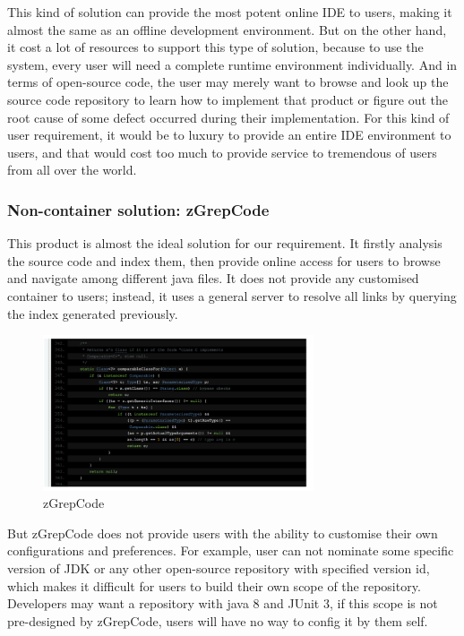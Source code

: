 \documentclass[runningheads]{llncs}
\begin{document}
This kind of solution can provide the most potent online IDE to users, making it almost the same as an offline development environment. But on the other hand, it cost a lot of resources to support this type of solution, because to use the system, every user will need a complete runtime environment individually. And in terms of open-source code, the user may merely want to browse and look up the source code repository to learn how to implement that product or figure out the root cause of some defect occurred during their implementation. For this kind of user requirement, it would be to luxury to provide an entire IDE environment to users, and that would cost too much to provide service to tremendous of users from all over the world.


\subsubsection{Non-container solution: zGrepCode\cite{zgrepcode}}
This product is almost the ideal solution for our requirement. It firstly analysis the source code and index them, then provide online access for users to browse and navigate among different java files. It does not provide any customised container to users; instead, it uses a general server to resolve all links by querying the index generated previously.

\begin{figure}[H]
	\centering
	\includegraphics[width=8cm]{pic/zGrepCode.png}
	\caption{zGrepCode}
	\label{zGrepCode}
\end{figure}

But zGrepCode does not provide users with the ability to customise their own configurations and preferences. For example, user can not nominate some specific version of JDK or any other open-source repository with specified version id, which makes it difficult for users to build their own scope of the repository. Developers may want a repository with java 8 and JUnit 3, if this scope is not pre-designed by zGrepCode, users will have no way to config it by them self.
\end{document}
